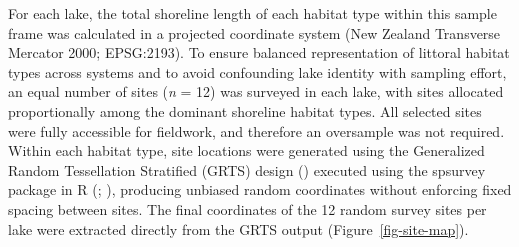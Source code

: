 \documentclass[
  letterpaper,
  DIV=11,
  numbers=noendperiod]{scrartcl}
\begin{document}
For each lake, the total shoreline length of each habitat type within
this sample frame was calculated in a projected coordinate system (New
Zealand Transverse Mercator 2000; EPSG:2193). To ensure balanced
representation of littoral habitat types across systems and to avoid
confounding lake identity with sampling effort, an equal number of sites
(\emph{n} = 12) was surveyed in each lake, with sites allocated
proportionally among the dominant shoreline habitat types. All selected
sites were fully accessible for fieldwork, and therefore an oversample
was not required. Within each habitat type, site locations were
generated using the Generalized Random Tessellation Stratified (GRTS)
design () executed
using the spsurvey package in R (; ), producing
unbiased random coordinates without enforcing fixed spacing between
sites. The final coordinates of the 12 random survey sites per lake were
extracted directly from the GRTS output (Figure~\ref{fig-site-map}).
\end{document}
